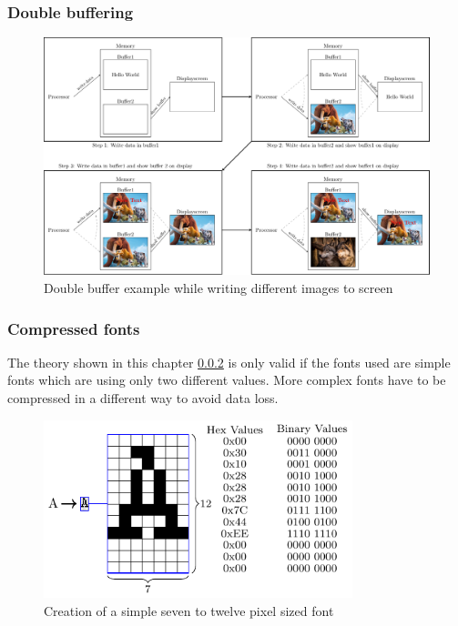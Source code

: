 \subsubsection{Double buffering}


  

\begin{figure}[H]
	\centering
	\includegraphics[width=1\textwidth]{2-theory/drawing-graphics/graphics/buffer.pdf}
	\caption{Double buffer example while writing different images to screen\label{theory:buffer}}
\end{figure}




\subsubsection{Compressed fonts}\label{chapter:CompressedFonts}

The theory shown in this chapter \ref{chapter:CompressedFonts} is only valid if the fonts used are simple fonts which are using only two different values. More complex fonts have to be compressed in a different way to avoid data loss. 
\begin{figure}[H]
	\centering
	\includegraphics[width=0.8\textwidth]{2-theory/drawing-graphics/graphics/font12.pdf}
	\caption{Creation of a simple seven to twelve pixel sized font\label{theory:font12}}
\end{figure}



